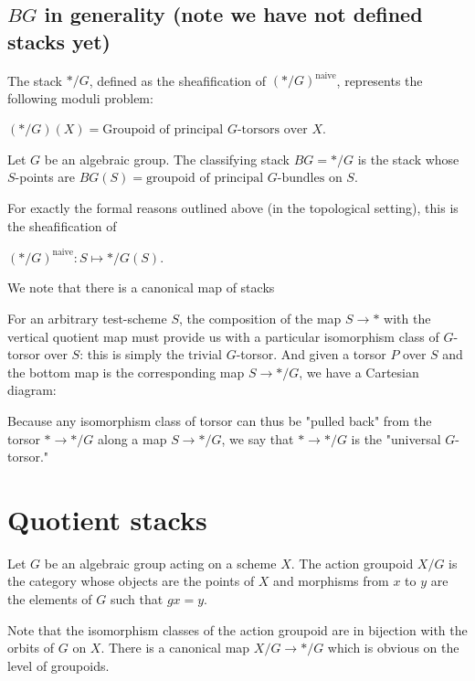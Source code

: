 \documentclass[12pt]{article}
\begin{document}
\subsection{$BG$ in generality (note we have not defined stacks yet)}
\begin{proposition}
    The stack $*/G$, defined as the sheafification of $(*/G)^{\text{naive}}$, represents the following moduli problem:
    \begin{center}
        $(*/G)(X) = \text{Groupoid of principal } G\text{-torsors over } X$.
    \end{center}
\end{proposition}

\begin{definition}
    Let $G$ be an algebraic group. The classifying stack $BG = */G$ is the stack whose $S$-points are $BG(S) = \text{groupoid of principal } G\text{-bundles on } S$.
\end{definition}
For exactly the formal reasons outlined above (in the topological setting), this is the sheafification of
\begin{center}
    $(*/G)^{\text{naive}} : S \mapsto */G(S)$.
\end{center}
We note that there is a canonical map of stacks
\begin{center}
\end{center}
For an arbitrary test-scheme $S$, the composition of the map $S \to *$ with the vertical quotient map must provide us with a particular isomorphism class of $G$-torsor over $S$: this is simply the trivial $G$-torsor. And given a torsor $P$ over $S$ and the bottom map is the corresponding map $S \to */G$, we have a Cartesian diagram:
\begin{center}
\end{center}

Because any isomorphism class of torsor can thus be "pulled back" from the torsor $* \to */G$ along a map $S \to */G$, we say that $* \to */G$ is the "universal $G$-torsor."

\section{Quotient stacks}
\begin{definition}
    Let $G$ be an algebraic group acting on a scheme $X$. The action groupoid $X/G$ is the category whose objects are the points of $X$ and morphisms from $x$ to $y$ are the elements of $G$ such that $gx = y$.
\end{definition} Note that the isomorphism classes of the action groupoid are in bijection with
the orbits of $G $ on $X$. There is a canonical map $X/G \to */G$ which is obvious on the level of groupoids.
\end{document}
